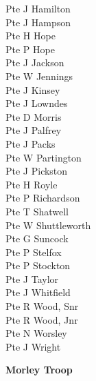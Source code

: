 \begin{multicols}{2}
  Pte J Hamilton \\
  Pte J Hampson \\
  Pte H Hope \\
  Pte P Hope \\
  Pte J Jackson \\
  Pte W Jennings \\
  Pte J Kinsey \\
  Pte J Lowndes \\
  Pte D Morris \\
  Pte J Palfrey \\
  Pte J Packs \\
  Pte W Partington \\
  Pte J Pickston \\
  Pte H Royle \\
  Pte P Richardson \\
  Pte T Shatwell \\
  Pte W Shuttleworth \\
  Pte G Suncock \\
  Pte P Stelfox \\
  Pte P Stockton \\
  Pte J Taylor \\
  Pte J Whitfield \\
  Pte R Wood, Snr \\
  Pte R Wood, Jnr \\
  Pte N Worsley \\
  Pte J Wright \\
\end{multicols}

\begin{center}
  \Large
  \textbf{Morley Troop}
\end{center}

